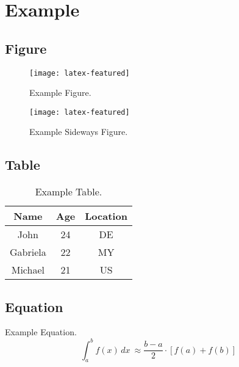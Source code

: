 \chapter{Example}

\section{Figure}

\begin{figure}
  \centering
  \texttt{[image: latex-featured]}
  \caption{Example Figure.}
  \label{fig:examplefigure}
\end{figure}

\begin{sidewaysfigure}
  \centering
  \texttt{[image: latex-featured]}
  \caption{Example Sideways Figure.}
  \label{fig:examplesidewaysfigure}
\end{sidewaysfigure}

\section{Table}

\begin{table}
  \centering
  \caption{Example Table.}
  \label{tab:exampletable}
  \begin{tabular}{ccc}
    \toprule
    Name & Age & Location \\ \midrule
    John & 24 & DE \\
    Gabriela & 22 & MY \\
    Michael & 21 & US \\ \bottomrule
  \end{tabular}
\end{table}

\section{Equation}

Example Equation.
\begin{equation}
  \int_{a}^{b} f(x) \, dx\ \approx \frac{b - a}{2} \cdot [f(a) + f(b)]
  \label{eq:exampleequation}
\end{equation}

